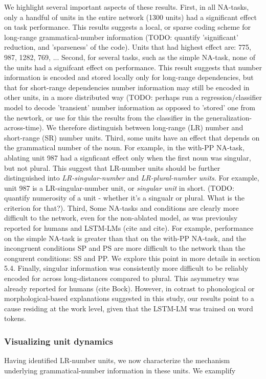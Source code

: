 We highlight several important aspects of these results. First, in all NA-tasks, only a handful of units in the entire network (1300 units) had a significant effect on task performance. This results suggests a local, or sparse coding scheme for long-range grammatical-number information (TODO: quantify 'significant' reduction, and 'sparseness' of the code). Units that had highest effect are: 775, 987, 1282, 769, ... Second, for several tasks, such as the simple NA-task, none of the units had a signifcant effect on performance. This result suggests that number information is encoded and stored locally only for long-range dependencies, but that for short-range dependencies number information may still be encoded in other units, in a more distributed way (TODO: perhaps run a regression/classifier model to decode 'transient' number information as opposed to 'stored' one from the newtork, or use for this the results from the classifier in the generalization-across-time). We therefore distinguish between long-range (LR) number and short-range (SR) number units. Third, some units have an effect that depends on the grammatical number of the noun. For example, in the with-PP NA-task, ablating unit 987 had a signficant effect only when the first noun was singular, but not plural. This suggest that LR-number units should be further distinguished into \textit{LR-singular-number} and \textit{LR-plural-number units}. For example, unit 987 is a LR-singular-number unit, or \textit{singular unit} in short. (TODO: quantify numerosity of a unit - whether it's a singualr or plural. What is the criterion for that?). Third, Some NA-tasks and conditions are clearly more difficult to the network, even for the non-ablated model, as was previoulsy reported for humans and LSTM-LMs (cite and cite). For example, performance on the simple NA-task is greater than that on the with-PP NA-task, and the incongruent conditions SP and PS are more difficult to the network than the congurent conditions: SS and PP. We explore this point in more details in section 5.4. Finally, singular information was consistently more difficult to be reliably encoded for across long-distances compared to plural. This asymmetry was already reported for humans (cite Bock). However, in cotrast to phonological or morphological-based explanations suggested in this study, our results point to a cause residing at the work level, given that the LSTM-LM was trained on word tokens.


\subsubsection{Visualizing unit dynamics}
Having identified LR-number units, we now characterize the mechanism underlying grammatical-number information in these units. We examplify 

